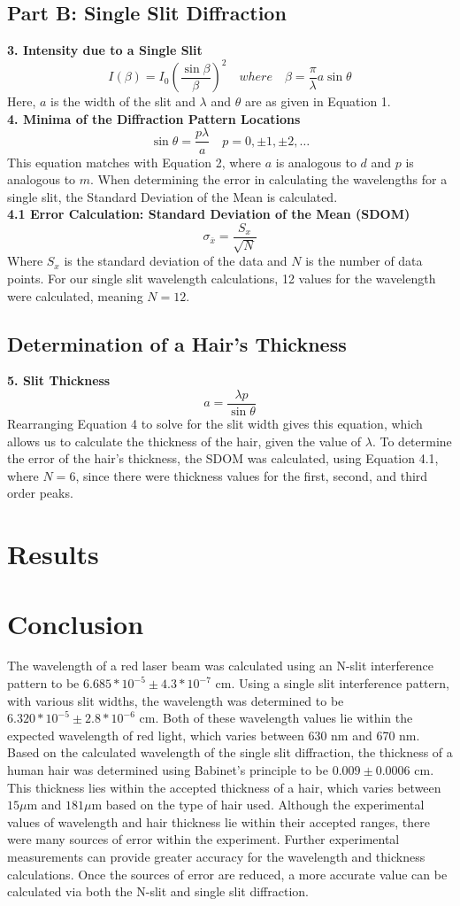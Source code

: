 \documentclass[12pt]{article}
\begin{document}
\subsection*{Part B: Single Slit Diffraction}
    \noindent\textbf{3. Intensity due to a Single Slit}\[I(\beta)=I_0\left(\frac{\sin\beta}{\beta}\right)^2\quad where \quad \beta=\frac{\pi}{\lambda}a\sin\theta\]
    Here, $a$ is the width of the slit and $\lambda$ and $\theta$ are as given in Equation 1.\\
\textbf{4. Minima of the Diffraction Pattern Locations} \[\sin\theta=\frac{p\lambda}{a} \quad p=0,\pm1,\pm2,\dots\]
This equation matches with Equation 2, where $a$ is analogous to $d$ and $p$ is analogous to $m$. When determining the error in calculating the wavelengths for a single slit, the Standard Deviation of the Mean is calculated.\\    
\textbf{4.1 Error Calculation: Standard Deviation of the Mean (SDOM)}\[\sigma_{\bar{x}}=\frac{S_x}{\sqrt{N}}\]
    Where $S_x$ is the standard deviation of the data and $N$ is the number of data points. For our single slit wavelength calculations, 12 values for the wavelength were calculated, meaning $N=12$.
\subsection*{Determination of a Hair's Thickness}
\noindent\textbf{5. Slit Thickness}\[a=\frac{\lambda p}{\sin\theta}\]
Rearranging Equation 4 to solve for the slit width gives this equation, which allows us to calculate the thickness of the hair, given the value of $\lambda$. 
To determine the error of the hair's thickness, the SDOM was calculated, using Equation 4.1, where $N=6$, since there were thickness values for the first, second, and third order peaks. 
\newpage
\section{Results}

\newpage
\section{Conclusion}
The wavelength of a red laser beam was calculated using an N-slit interference pattern to be  $6.685*10^{-5} \pm 4.3*10^{-7}$ cm. Using a single slit interference pattern, with various slit widths, the wavelength was determined to be $6.320*10^{-5}\pm 2.8*10^{-6}$ cm.
Both of these wavelength values lie within the expected wavelength of red light, which varies between 630 nm and 670 nm.
Based on the calculated wavelength of the single slit diffraction, the thickness of a human hair was determined using Babinet's principle to be $0.009 \pm 0.0006$ cm. 
This thickness lies within the accepted thickness of a hair, which varies between $15 \mu$m and $181 \mu$m based on the type of hair used.
Although the experimental values of wavelength and hair thickness lie within their accepted ranges, there were many sources of error within the experiment. 
Further experimental measurements can provide greater accuracy for the wavelength and thickness calculations.
Once the sources of error are reduced, a more accurate value can be calculated via both the N-slit and single slit diffraction. 
\newpage
\end{document}
